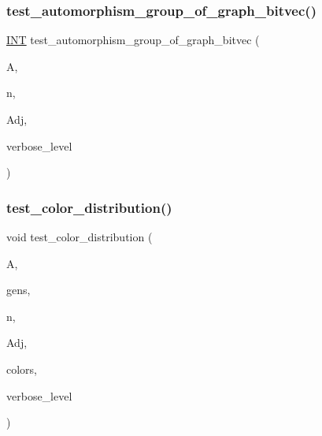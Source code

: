 \subsubsection{\texorpdfstring{test\+\_\+automorphism\+\_\+group\+\_\+of\+\_\+graph\+\_\+bitvec()}{test\_automorphism\_group\_of\_graph\_bitvec()}}
{\footnotesize\ttfamily \mbox{\hyperlink{galois_8h_a09fddde158a3a20bd2dcadb609de11dc}{I\+NT}} test\+\_\+automorphism\+\_\+group\+\_\+of\+\_\+graph\+\_\+bitvec (\begin{DoxyParamCaption}\item[{\mbox{\hyperlink{classaction}{action}} $\ast$}]{A,  }\item[{\mbox{\hyperlink{galois_8h_a09fddde158a3a20bd2dcadb609de11dc}{I\+NT}}}]{n,  }\item[{\mbox{\hyperlink{galois_8h_a122c4acf389c050379f00341fdcd5812}{U\+B\+Y\+TE}} $\ast$}]{Adj,  }\item[{\mbox{\hyperlink{galois_8h_a09fddde158a3a20bd2dcadb609de11dc}{I\+NT}}}]{verbose\+\_\+level }\end{DoxyParamCaption})}

\mbox{\label{action__global_8_c_a15d0bcd0cb76faa3afbc6db2fdbff365}} 
\subsubsection{\texorpdfstring{test\+\_\+color\+\_\+distribution()}{test\_color\_distribution()}}
{\footnotesize\ttfamily void test\+\_\+color\+\_\+distribution (\begin{DoxyParamCaption}\item[{\mbox{\hyperlink{classaction}{action}} $\ast$}]{A,  }\item[{\mbox{\hyperlink{classvector__ge}{vector\+\_\+ge}} $\ast$}]{gens,  }\item[{\mbox{\hyperlink{galois_8h_a09fddde158a3a20bd2dcadb609de11dc}{I\+NT}}}]{n,  }\item[{\mbox{\hyperlink{galois_8h_a122c4acf389c050379f00341fdcd5812}{U\+B\+Y\+TE}} $\ast$}]{Adj,  }\item[{\mbox{\hyperlink{galois_8h_a09fddde158a3a20bd2dcadb609de11dc}{I\+NT}} $\ast$}]{colors,  }\item[{\mbox{\hyperlink{galois_8h_a09fddde158a3a20bd2dcadb609de11dc}{I\+NT}}}]{verbose\+\_\+level }\end{DoxyParamCaption})}

